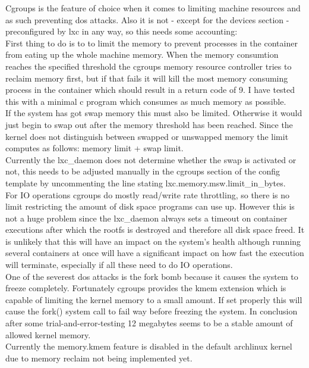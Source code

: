 Cgroups is the feature of choice when it comes to limiting machine resources and as such preventing dos attacks.
Also it is not - except for the devices section - preconfigured by lxc in any way, so this needs some accounting:\\
First thing to do is to to limit the memory to prevent processes in the container from eating up the whole machine memory.
When the memory consumtion reaches the specified threshold the cgroups memory resource controller tries to reclaim memory first,
but if that fails it will kill the most memory consuming process in the container which should result in a return code of 9\cite{cgrpmem}.
I have tested this with a minimal c program which consumes as much memory as possible.\\
If the system has got swap memory this must also be limited. Otherwise it would just begin to swap out after the memory
threshold has been reached. Since the kernel does not distinguish between swapped or unswapped memory the limit computes as follows:
memory limit + swap limit.\\
Currently the lxc_daemon does not determine whether the swap is activated or not, this needs to be adjusted manually in the cgroups
section of the config template by uncommenting the line stating lxc.memory.msw.limit\_in\_bytes.\\
For IO operations cgroups do mostly read/write rate throttling, so there is no limit restricting the amount of disk space programs
can use up. However this is not a huge problem since the lxc\_daemon always sets a timeout on container executions after which the
rootfs is destroyed and therefore all disk space freed. It is unlikely that this will have an impact on the system's health although
running several containers at once will have a significant impact on how fast the execution will terminate, especially if all these
need to do IO operations.\\
One of the severest dos attacks is the fork bomb because it causes the system to freeze completely\cite{forkbomb}. Fortunately cgroups provides
the kmem extension which is capable of limiting the kernel memory to a small amount. If set properly this will cause the fork()
system call to fail way before freezing the system. In conclusion after some trial-and-error-testing 12 megabytes seems to be a
stable amount of allowed kernel memory.\\
Currently the memory.kmem feature is disabled in the default archlinux kernel due to memory reclaim not being implemented yet\cite{kmembug}.\\

